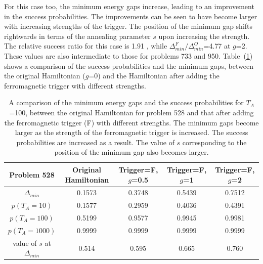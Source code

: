 \documentclass[../main.tex]{subfiles}
\begin{document}
For this case too, the minimum energy gaps increase, leading to an improvement in the success probabilities. The improvements can be seen to have become larger with increasing strengths of the trigger. The position of the minimum gap shifts rightwards in terms of the annealing parameter $s$ upon increasing the strength. \\
The relative success ratio for this case is 1.91 , while $\Delta_{min}^F/\Delta_{min}^O$=4.77 at $g$=2. These values are also intermediate to those for problems 733 and 950. Table~(\ref{tab:f3}) shows a comparison of the success probabilities and the minimum gaps, between the original Hamiltonian ($g$=0) and the Hamiltonian after adding the ferromagnetic trigger with different strengths.
\begin{table}[H]
\centering
\renewcommand{\arraystretch}{1.3}
\begin{tabular}{|c|c|c|c|c|}
\hline 
Problem 528 & Original Hamiltonian & Trigger=F, $g$=0.5 & Trigger=F, $g$=1 & Trigger=F, $g$=2 \\ 
\hline 
$\Delta_{min}$ & 0.1573 & 0.3748 & 0.5439 & 0.7512 \\ 
\hline 
$p(T_A=10)$ & 0.1577 & 0.2959 & 0.4036 & 0.4391 \\
\hline 
$p(T_A=100)$ & 0.5199 & 0.9577 & 0.9945 & 0.9981 \\ 
\hline 
$p(T_A=1000)$ & 0.9999 & 0.9999 & 0.9999 & 0.9999 \\
\hline 
value of $s$ at $\Delta_{min}$ & 0.514 & 0.595 & 0.665 & 0.760 \\
\hline

\end{tabular} 
\caption{A comparison of the minimum energy gaps and the success probabilities for $T_A$=100, between the original Hamiltonian for problem 528 and that after adding the ferromagnetic trigger (F) with different strengths. The minimum gaps become larger as the strength of the ferromagnetic trigger is increased. The success probabilities are increased as a result. The value of $s$ corresponding to the position of the minimum gap also becomes larger.}
\label{tab:f3}
\end{table}
\end{document}
